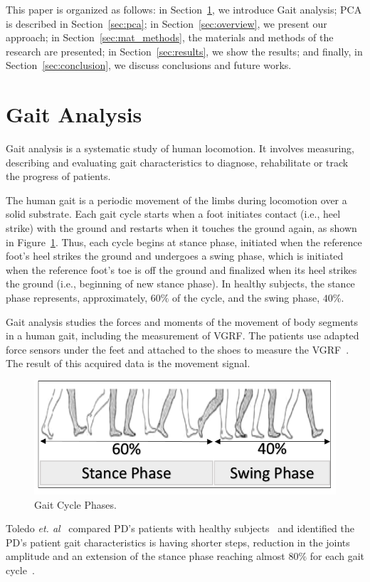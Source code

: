 \documentclass[10pt, conference, compsocconf]{IEEEtran}
\begin{document}
This paper is organized as follows: in Section~\ref{sec:gait_analysis}, we introduce Gait analysis; PCA is described in Section~\ref{sec:pca}; in Section~\ref{sec:overview}, we present our approach; in Section~\ref{sec:mat_methods}, the materials and methods of the research are presented; in Section~\ref{sec:results}, we show the results; and finally, in Section~\ref{sec:conclusion}, we discuss conclusions and future works.




\section{Gait Analysis}\label{sec:gait_analysis}
Gait analysis is a systematic study of human locomotion. It involves measuring, describing and evaluating gait characteristics to diagnose, rehabilitate or track the progress of patients.

The human gait is a periodic movement of the limbs during locomotion over a solid substrate. Each gait cycle starts when a foot initiates contact (i.e., heel strike) with the ground and restarts when it touches the ground again, as shown in Figure~\ref{fig:gaitcycles}. Thus, each cycle begins at stance phase, initiated when the reference foot's heel strikes the ground and undergoes a swing phase, which is initiated when the reference foot's toe is off the ground and finalized when its heel strikes the ground (i.e., beginning of new stance phase). In healthy subjects, the stance phase represents, approximately, $60\%$ of the cycle, and the swing phase, $40\%$. 

Gait analysis studies the forces and moments of the movement of body segments in a human gait, including the measurement of VGRF. The patients use adapted force sensors under the feet and attached to the shoes to measure the VGRF~\cite{gaitusingsensorsreview2012}. The result of this acquired data is the movement signal.

\begin{figure}[!ht]
\centering
\includegraphics[width=.49\textwidth]{img/gaitlmm2.png}
\caption{Gait Cycle Phases.}
\label{fig:gaitcycles}
\end{figure}

Toledo \textit{et. al}~\cite{toledo2005} compared PD's patients with healthy subjects~\cite{toledo2005,visionbased2009} and identified the PD's patient gait characteristics is having shorter steps, reduction in the joints amplitude and an extension of the stance phase reaching almost $80\%$ for each gait cycle~\cite{ambulatory2010}.
\end{document}
